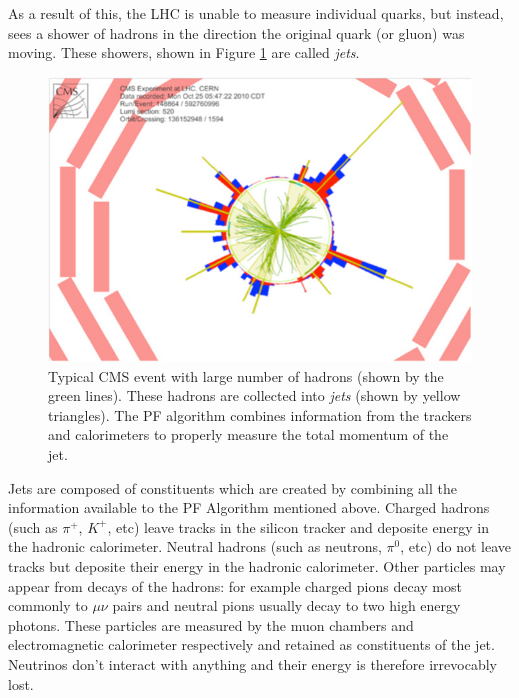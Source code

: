 As a result of this, the LHC is unable to measure individual quarks, but instead, sees a shower of hadrons in the direction the original quark (or gluon) was moving. These showers, shown in Figure \ref{Fig:CMS:Jet} are called \textit{jets}. 
\begin{figure}[h!]
    \centering
        \includegraphics[width=\textwidth]{F3/Jets}
        \caption{Typical CMS event with large number of hadrons (shown by the green lines). These hadrons are collected into \textit{jets} (shown by yellow triangles). The PF algorithm combines information from the trackers and calorimeters to properly measure the total momentum of the jet.}
        \label{Fig:CMS:Jet}
\end{figure}
Jets are composed of constituents which are created by combining all the information available to the PF Algorithm mentioned above. Charged hadrons (such as $\pi^{+}$, $K^{+}$, etc) leave tracks in the silicon tracker and deposite energy in the hadronic calorimeter. Neutral hadrons (such as neutrons, $\pi^0$, etc) do not leave tracks but deposite their energy in the hadronic calorimeter. Other particles may appear from decays of the hadrons: for example charged pions decay most commonly to $\mu\nu$ pairs and neutral pions usually decay to two high energy photons. These particles are measured by the muon chambers and electromagnetic calorimeter respectively and retained as constituents of the jet. Neutrinos don't interact with anything and their energy is therefore irrevocably lost.

